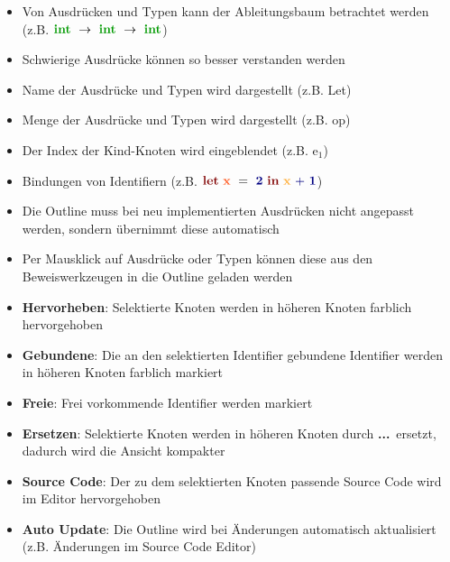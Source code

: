 {
  \begin{itemize}
    \item Von Ausdrücken und Typen kann der Ableitungsbaum betrachtet werden
          (z.B. $\TypeArrowType{\TypeIntegerType}{\TypeArrowType{\TypeIntegerType}{\TypeIntegerType}}$)
    \item Schwierige Ausdrücke können so besser verstanden werden
    \item Name der Ausdrücke und Typen wird dargestellt (z.B. Let)
    \item Menge der Ausdrücke und Typen wird dargestellt (z.B. op)
    \item Der Index der Kind-Knoten wird eingeblendet (z.B. e$_1$)
    \item Bindungen von Identifiern (z.B. $\ExprLet{\ExprIdentifierBinding{x}}{}{\ExprConstant{2}}
          {\ExprInfixOperation{\ExprBinaryOperator{+}}{\ExprIdentifierBound{x}}{\ExprConstant{1}}}$)
    \item Die Outline muss bei neu implementierten Ausdrücken nicht angepasst
          werden, sondern übernimmt diese automatisch
    \item Per Mausklick auf Ausdrücke oder Typen können diese aus den Beweiswerkzeugen
          in die Outline geladen werden
  \end{itemize}
}

{
  \begin{itemize}
    \item \textbf{Hervorheben}: Selektierte Knoten werden in höheren Knoten farblich
                                hervorgehoben
    \item \textbf{Gebundene}: Die an den selektierten Identifier gebundene Identifier
                              werden in höheren Knoten farblich markiert
    \item \textbf{Freie}: Frei vorkommende Identifier werden markiert
    \item \textbf{Ersetzen}: Selektierte Knoten werden in höheren Knoten durch
                             \glqq\textbf{...}\grqq\ ersetzt, dadurch wird die Ansicht
                             kompakter
    \item \textbf{Source Code}: Der zu dem selektierten Knoten passende Source Code
                                wird im Editor hervorgehoben
    \item \textbf{Auto Update}: Die Outline wird bei Änderungen automatisch aktualisiert
                                (z.B. Änderungen im Source Code Editor)
  \end{itemize}
}

